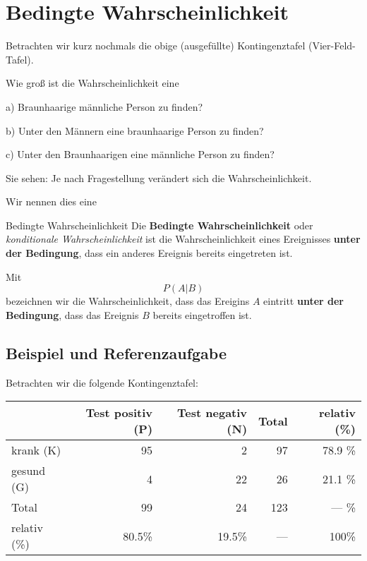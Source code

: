 
\section{Bedingte Wahrscheinlichkeit}

Betrachten wir kurz nochmals die obige (ausgefüllte) Kontingenztafel (Vier-Feld-Tafel).

Wie groß ist die Wahrscheinlichkeit eine

a) Braunhaarige männliche Person zu finden? 

b) Unter den Männern eine braunhaarige Person zu finden? 

c) Unter den Braunhaarigen eine männliche Person zu finden? 

Sie sehen: Je nach Fragestellung verändert sich die Wahrscheinlichkeit.

Wir nennen dies eine

\begin{definition}{Bedingte Wahrscheinlichkeit}{}
Die \textbf{Bedingte Wahrscheinlichkeit} oder \textit{konditionale
  Wahrscheinlichkeit} ist die Wahrscheinlichkeit eines Ereignisses
\textbf{unter der Bedingung}, dass ein anderes Ereignis bereits
eingetreten ist.
  \end{definition}

\begin{definition}{}{}
  Mit
  $$P(A | B)$$
  bezeichnen wir die Wahrscheinlichkeit, dass das Ereigins $A$
  eintritt \textbf{unter der Bedingung}, dass das Ereignis $B$ bereits
  eingetroffen ist.
\end{definition}
\newpage


\subsection{Beispiel und Referenzaufgabe}
Betrachten wir die folgende Kontingenztafel:

  \begin{tabular}{|l|r|r|r|r|}\hline
                 & Test positiv (P) & Test negativ (N)& Total & relativ (\%) \\\hline
    krank (K)        & 95           & 2            & 97    & 78.9 \%      \\\hline    
    gesund (G)    & 4            & 22           & 26    & 21.1 \%      \\\hline
    Total        & 99           & 24           & 123   &  --- \%      \\\hline
    relativ (\%) & 80.5\%       &19.5\%        & ---   &   100\%      \\\hline

  \end{tabular}
  
